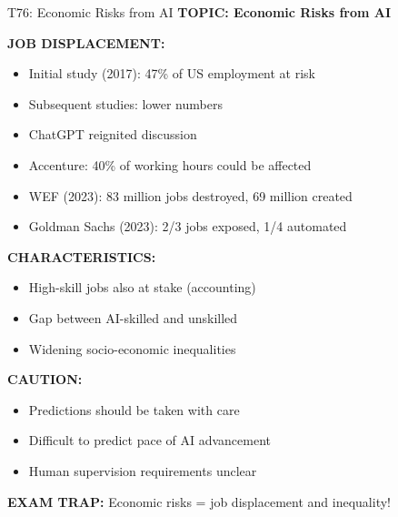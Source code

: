 \documentclass[8pt]{beamer}
\begin{document}
	\begin{frame}{T76: Economic Risks from AI}
		\fontsize{6.5}{7.5}\selectfont
		\textbf{TOPIC: Economic Risks from AI}
		
		\vspace{0.1cm}
		\textbf{JOB DISPLACEMENT:}
		\begin{itemize}
			\item Initial study (2017): 47\% of US employment at risk
			\item Subsequent studies: lower numbers
			\item ChatGPT reignited discussion
			\item Accenture: 40\% of working hours could be affected
			\item WEF (2023): 83 million jobs destroyed, 69 million created
			\item Goldman Sachs (2023): 2/3 jobs exposed, 1/4 automated
		\end{itemize}
		
		\vspace{0.1cm}
		\textbf{CHARACTERISTICS:}
		\begin{itemize}
			\item High-skill jobs also at stake (accounting)
			\item Gap between AI-skilled and unskilled
			\item Widening socio-economic inequalities
		\end{itemize}
		
		\vspace{0.1cm}
		\textbf{CAUTION:}
		\begin{itemize}
			\item Predictions should be taken with care
			\item Difficult to predict pace of AI advancement
			\item Human supervision requirements unclear
		\end{itemize}
		
		\textcolor{myred}{\textbf{EXAM TRAP:}} Economic risks = \textcolor{myblue}{job displacement and inequality}!
	\end{frame}
	
\end{document}
